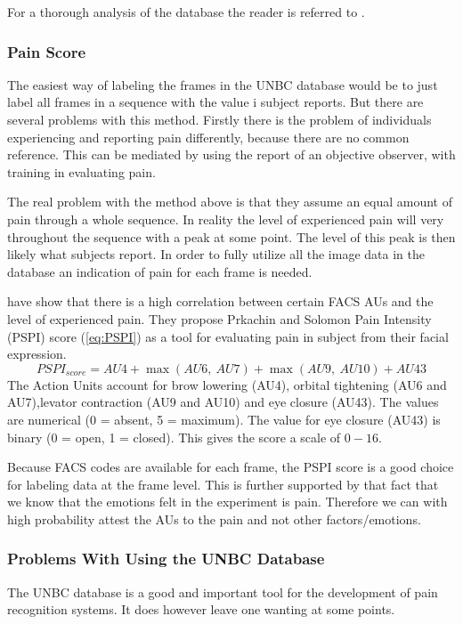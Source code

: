 \documentclass[Main]{subfiles}
\begin{document}
		For a thorough analysis of the database the reader is referred to \cite{Lucey2012}.
		
		\subsubsection{Pain Score} %
			\label{ssub:pain_score}
			The easiest way of labeling the frames in the UNBC database would be to just label all frames in a sequence with the value i subject reports.
			But there are several problems with this method.
			Firstly there is the problem of individuals experiencing and reporting pain differently, because there are no common reference.
			This can be mediated by using the report of an objective observer, with training in evaluating pain.

			The real problem with the method above is that they assume an equal amount of pain through a whole sequence.
			In reality the level of experienced pain will very throughout the sequence with a peak at some point.
			The level of this peak is then likely what subjects report.
			In order to fully utilize all the image data in the database an indication of pain for each frame is needed.

			\citet{Prkachin1992} have show that there is a high correlation between certain FACS AUs and the level of experienced pain.
			They propose Prkachin and Solomon Pain Intensity (PSPI) score (\ref{eq:PSPI}) as a tool for evaluating pain in subject from their facial expression.
			\begin{equation}
				\label{eq:PSPI} 
				PSPI_{score} = 
					AU4 + \max(AU6,\ AU7) + \max(AU9,\ AU10) + AU43
			\end{equation}
			The Action Units account for brow lowering (AU4), orbital tightening (AU6 and AU7),levator contraction (AU9 and AU10) and eye closure (AU43).
			The values are numerical (0 = absent, 5 = maximum).
			The value for eye closure (AU43) is binary (0 = open, 1 = closed).
			This gives the score a scale of $0-16$.

			Because FACS codes are available for each frame, the PSPI score is a good choice for labeling data at the frame level.
			This is further supported by that fact that we know that the emotions felt in the experiment is pain.
			Therefore we can with high probability attest the AUs to the pain and not other factors/emotions.


		\subsubsection{Problems With Using the UNBC Database} %
			\label{ssub:problems_with_using_the_unbc_database}
			The UNBC database is a good and important tool for the development of pain recognition systems.
			It does however leave one wanting at some points.
\end{document}
